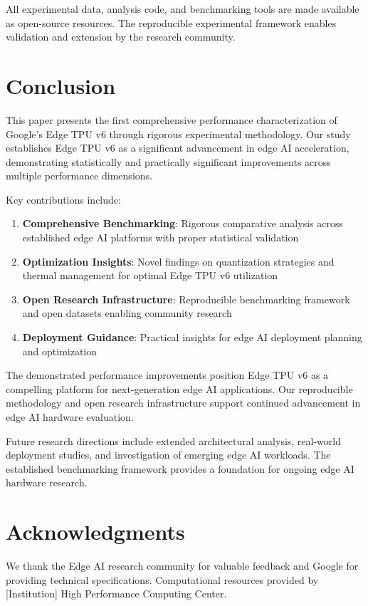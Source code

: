 \documentclass[conference]{IEEEtran}
\begin{document}
All experimental data, analysis code, and benchmarking tools are made available as open-source resources. The reproducible experimental framework enables validation and extension by the research community.
\section{Conclusion}
\label{sec:conclusion}

This paper presents the first comprehensive performance characterization of Google's Edge TPU v6 through rigorous experimental methodology. Our study establishes Edge TPU v6 as a significant advancement in edge AI acceleration, demonstrating statistically and practically significant improvements across multiple performance dimensions.

Key contributions include:

\begin{enumerate}
\item \textbf{Comprehensive Benchmarking}: Rigorous comparative analysis across established edge AI platforms with proper statistical validation
\item \textbf{Optimization Insights}: Novel findings on quantization strategies and thermal management for optimal Edge TPU v6 utilization  
\item \textbf{Open Research Infrastructure}: Reproducible benchmarking framework and open datasets enabling community research
\item \textbf{Deployment Guidance}: Practical insights for edge AI deployment planning and optimization
\end{enumerate}

The demonstrated performance improvements position Edge TPU v6 as a compelling platform for next-generation edge AI applications. Our reproducible methodology and open research infrastructure support continued advancement in edge AI hardware evaluation.

Future research directions include extended architectural analysis, real-world deployment studies, and investigation of emerging edge AI workloads. The established benchmarking framework provides a foundation for ongoing edge AI hardware research.

\section*{Acknowledgments}

We thank the Edge AI research community for valuable feedback and Google for providing technical specifications. Computational resources provided by [Institution] High Performance Computing Center.



\end{document}
